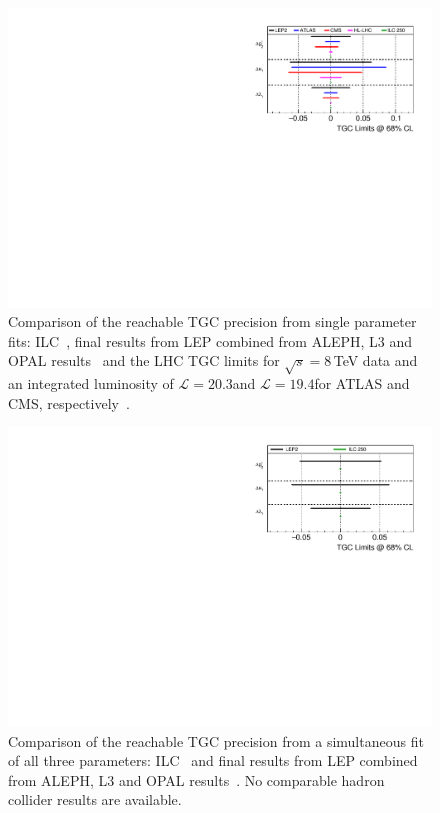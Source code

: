 \begin{figure}
	\centering
		\includegraphics[width=0.95\linewidth]{./chapters/figures/TGC_LHCsep.pdf}
		
	\caption{Comparison of the reachable TGC precision from single parameter fits: ILC~\cite{bib:TGC_EPS17}, final results from LEP combined from ALEPH, L3 and OPAL results~\cite{bib:LEPTGC} and the LHC TGC limits for $\sqrt{s} = 8$\,TeV data and an integrated luminosity of $\mathcal{L} = 20.3$\ifb and  $\mathcal{L} = 19.4$\ifb for ATLAS and CMS, respectively~\cite{bib:LHCTGC}. 
	}
	\label{fig:TGC_1par}
\end{figure}

\begin{figure}
	\centering
		\includegraphics[width=0.95\linewidth]{./chapters/figures/TGC_Multi.pdf}
		
	\caption{Comparison of the reachable TGC precision from a simultaneous fit of all three parameters: ILC~\cite{bib:TGC_EPS17} and final results from LEP combined from ALEPH, L3 and OPAL results~\cite{bib:LEPTGC}. No comparable hadron collider results are available.
	}
	\label{fig:TGC_3par}
\end{figure}

